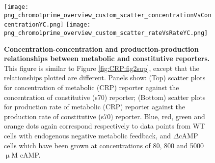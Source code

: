 \begin{figure}
	\centering
	\texttt{[image: png\_chromo1prime\_overview\_custom\_scatter\_concentrationVsConcentrationYC.png]}
	\texttt{[image: png\_chromo1prime\_overview\_custom\_scatter\_rateVsRateYC.png]}	
	\caption{ 
		\textbf{Concentration-concentration and production-production relationships between metabolic and constitutive reporters.}
		This figure is similar to Figure \ref{fig:CRP:fig2sup}, except that the relationships plotted are different.
		Panels show: (Top) scatter plots for concentration of metabolic (CRP) reporter against the concentration of constitutive (s70) reporter; 
		(Bottom) scatter plots for production rate of metabolic (CRP) reporter against the production rate of constitutive (s70) reporter.
		Blue, red, green and orange dots again correspond respectively to data points from WT cells with endogenous negative metabolic feedback, and $\Delta$cAMP cells which have been grown at concentrations of 80, 800 and 5000 $\upmu$M cAMP.
	}
	\label{fig:CRP:fig3scatters_CC_pp}
\end{figure}




